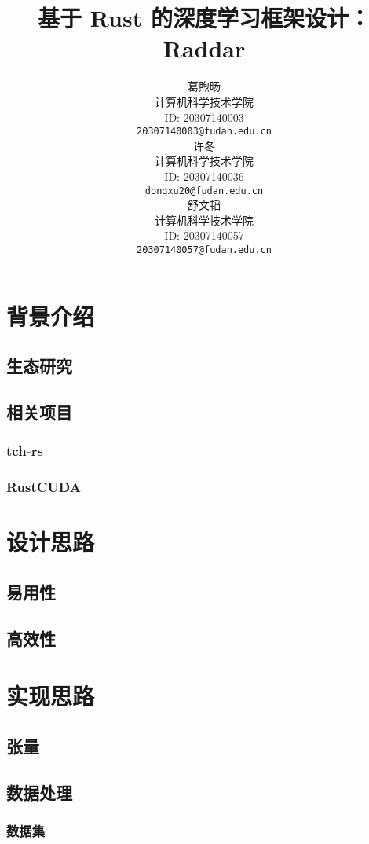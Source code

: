 \documentclass{article}
\title{基于 Rust 的深度学习框架设计：Raddar}
\author{%
葛煦旸 \\ %
计算机科学技术学院 \\ %
ID: 20307140003 \\
\texttt{20307140003@fudan.edu.cn} \\
\AND
许冬 \\ %
计算机科学技术学院 \\ %
ID: 20307140036 \\
\texttt{dongxu20@fudan.edu.cn} \\
\AND
舒文韬 \\ %
计算机科学技术学院 \\ %
ID: 20307140057 \\
\texttt{20307140057@fudan.edu.cn} \\
}
\begin{document}
\maketitle

\begin{abstract}
	
\end{abstract}

\section{背景介绍}
\subsection{生态研究}
\subsection{相关项目}
\subsubsection{tch-rs}
\subsubsection{RustCUDA}

\section{设计思路}
\subsection{易用性}
\subsection{高效性}

\section{实现思路}
\subsection{张量}
\subsection{数据处理}
\subsubsection{数据集}
\end{document}
